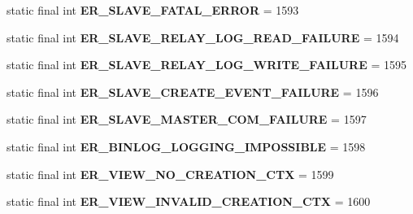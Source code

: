 \begin{DoxyCompactItemize}
static final int {\bfseries E\+R\+\_\+\+S\+L\+A\+V\+E\+\_\+\+F\+A\+T\+A\+L\+\_\+\+E\+R\+R\+OR} = 1593
\item 
\mbox{\label{classcom_1_1mysql_1_1jdbc_1_1_mysql_error_numbers_a51005df067141243d985684c7f19e48f}} 
static final int {\bfseries E\+R\+\_\+\+S\+L\+A\+V\+E\+\_\+\+R\+E\+L\+A\+Y\+\_\+\+L\+O\+G\+\_\+\+R\+E\+A\+D\+\_\+\+F\+A\+I\+L\+U\+RE} = 1594
\item 
\mbox{\label{classcom_1_1mysql_1_1jdbc_1_1_mysql_error_numbers_a73a22564a3e4cd2e8a2901426415464e}} 
static final int {\bfseries E\+R\+\_\+\+S\+L\+A\+V\+E\+\_\+\+R\+E\+L\+A\+Y\+\_\+\+L\+O\+G\+\_\+\+W\+R\+I\+T\+E\+\_\+\+F\+A\+I\+L\+U\+RE} = 1595
\item 
\mbox{\label{classcom_1_1mysql_1_1jdbc_1_1_mysql_error_numbers_a45fd8faaf6b3485c4641f36b7e14a7c9}} 
static final int {\bfseries E\+R\+\_\+\+S\+L\+A\+V\+E\+\_\+\+C\+R\+E\+A\+T\+E\+\_\+\+E\+V\+E\+N\+T\+\_\+\+F\+A\+I\+L\+U\+RE} = 1596
\item 
\mbox{\label{classcom_1_1mysql_1_1jdbc_1_1_mysql_error_numbers_a1ddd5bcab0fee9dd4ed75b3e1d978867}} 
static final int {\bfseries E\+R\+\_\+\+S\+L\+A\+V\+E\+\_\+\+M\+A\+S\+T\+E\+R\+\_\+\+C\+O\+M\+\_\+\+F\+A\+I\+L\+U\+RE} = 1597
\item 
\mbox{\label{classcom_1_1mysql_1_1jdbc_1_1_mysql_error_numbers_a4794977a793592deabf4bd24537090ce}} 
static final int {\bfseries E\+R\+\_\+\+B\+I\+N\+L\+O\+G\+\_\+\+L\+O\+G\+G\+I\+N\+G\+\_\+\+I\+M\+P\+O\+S\+S\+I\+B\+LE} = 1598
\item 
\mbox{\label{classcom_1_1mysql_1_1jdbc_1_1_mysql_error_numbers_a1aa6cd0dceeb9d67660a98784ff957b7}} 
static final int {\bfseries E\+R\+\_\+\+V\+I\+E\+W\+\_\+\+N\+O\+\_\+\+C\+R\+E\+A\+T\+I\+O\+N\+\_\+\+C\+TX} = 1599
\item 
\mbox{\label{classcom_1_1mysql_1_1jdbc_1_1_mysql_error_numbers_a702989e2c18f306a18812430bcd8be13}} 
static final int {\bfseries E\+R\+\_\+\+V\+I\+E\+W\+\_\+\+I\+N\+V\+A\+L\+I\+D\+\_\+\+C\+R\+E\+A\+T\+I\+O\+N\+\_\+\+C\+TX} = 1600

\end{DoxyCompactItemize}
